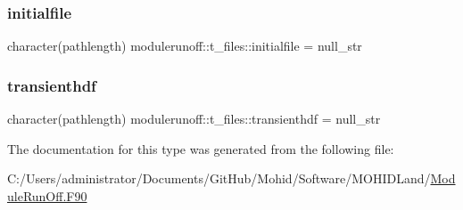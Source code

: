 \subsubsection{\texorpdfstring{initialfile}{initialfile}}
{\footnotesize\ttfamily character(pathlength) modulerunoff\+::t\+\_\+files\+::initialfile = null\+\_\+str\hspace{0.3cm}{\ttfamily [private]}}

\mbox{\label{structmodulerunoff_1_1t__files_a96879f0959c7c108ebcef0231509c8d1}} 
\subsubsection{\texorpdfstring{transienthdf}{transienthdf}}
{\footnotesize\ttfamily character(pathlength) modulerunoff\+::t\+\_\+files\+::transienthdf = null\+\_\+str\hspace{0.3cm}{\ttfamily [private]}}



The documentation for this type was generated from the following file\+:\begin{DoxyCompactItemize}
\item 
C\+:/\+Users/administrator/\+Documents/\+Git\+Hub/\+Mohid/\+Software/\+M\+O\+H\+I\+D\+Land/\mbox{\hyperlink{_module_run_off_8_f90}{Module\+Run\+Off.\+F90}}\end{DoxyCompactItemize}

